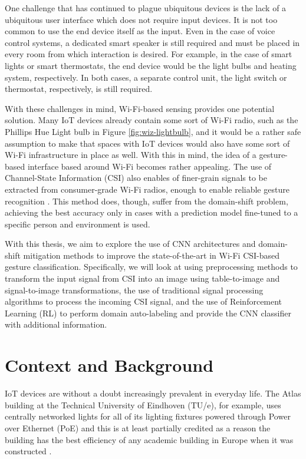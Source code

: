 One challenge that has continued to plague ubiquitous devices is the lack of a ubiquitous user interface which does not require input devices.
It is not too common to use the end device itself as the input.
Even in the case of voice control systems, a dedicated smart speaker is still required and must be placed in every room from which interaction is desired.
For example, in the case of smart lights or smart thermostats, the end device would be the light bulbs and heating system, respectively.
In both cases, a separate control unit, the light switch or thermostat, respectively, is still required.

With these challenges in mind, Wi-Fi-based sensing provides one potential solution.
Many IoT devices already contain some sort of Wi-Fi radio, such as the Phillips Hue Light bulb in Figure \ref{fig:wiz-lightbulb}, and it would be a rather safe assumption to make that spaces with IoT devices would also have some sort of Wi-Fi infrastructure in place as well.
With this in mind, the idea of a gesture-based interface based around Wi-Fi becomes rather appealing.
The use of Channel-State Information (CSI) also enables of finer-grain signals to be extracted from consumer-grade Wi-Fi radios, enough to enable reliable gesture recognition \cite{adib2013see}.
This method does, though, suffer from the domain-shift problem, achieving the best accuracy only in cases with a prediction model fine-tuned to a specific person and environment is used.

With this thesis, we aim to explore the use of CNN architectures and domain-shift mitigation methods to improve the state-of-the-art in Wi-Fi CSI-based gesture classification.
Specifically, we will look at using preprocessing methods to transform the input signal from CSI into an image using table-to-image and signal-to-image transformations, the use of traditional signal processing algorithms to process the incoming CSI signal, and the use of Reinforcement Learning (RL) to perform domain auto-labeling and provide the CNN classifier with additional information.

\section{Context and Background}\label{sec:intro-context}

IoT devices are without a doubt increasingly prevalent in everyday life.
The Atlas building at the Technical University of Eindhoven (TU/e), for example, uses centrally networked lights for all of its lighting fixtures powered through Power over Ethernet (PoE) and this is at least partially credited as a reason the building has the best efficiency of any academic building in Europe when it was constructed \cite{tue2019atlas}.

